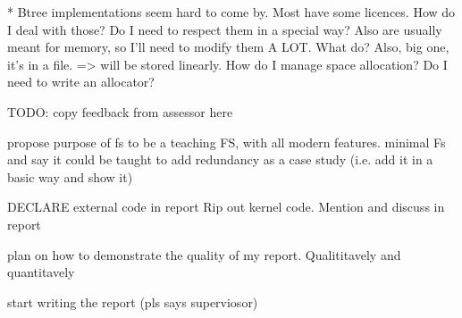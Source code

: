 \documentclass[a4paper]{report}
\begin{document}
        * Btree implementations seem hard to come by. Most have some licences.
            How do I deal with those? Do I need to respect them in a special
            way? Also are usually meant for memory, so I'll need to modify them
            A LOT. What do? Also, big one, it's in a file. => will be stored
            linearly. How do I manage space allocation? Do I need to write an
            allocator?

            TODO: copy feedback from assessor here

    propose purpose of fs to be a teaching FS, with all modern features. minimal Fs
    and say it could be taught to add redundancy as a case study (i.e. add it in a basic way and show it)

    DECLARE external code in report
    Rip out kernel code. Mention and discuss in report

    plan on how to demonstrate the quality of my report. Qualititavely and quantitavely

    start writing the report (pls says superviosor)
\end{document}
